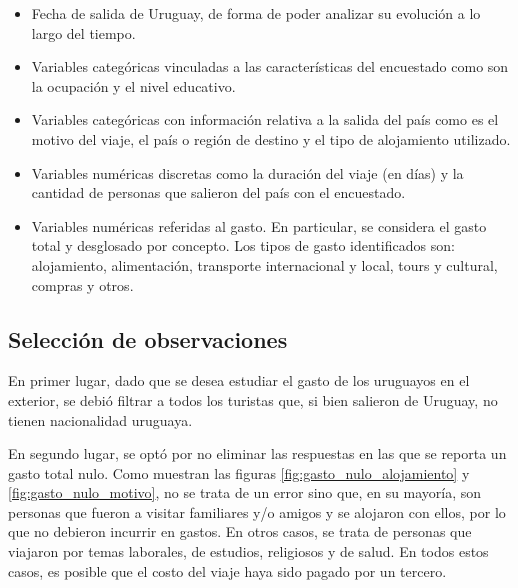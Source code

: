 \documentclass[
]{article}
\providecommand{\tightlist}{%
  \setlength{\itemsep}{0pt}\setlength{\parskip}{0pt}}
\begin{document}
\begin{itemize}
\tightlist
\item
  Fecha de salida de Uruguay, de forma de poder analizar su evolución a
  lo largo del tiempo.
\item
  Variables categóricas vinculadas a las características del encuestado
  como son la ocupación y el nivel educativo.
\item
  Variables categóricas con información relativa a la salida del país
  como es el motivo del viaje, el país o región de destino y el tipo de
  alojamiento utilizado.
\item
  Variables numéricas discretas como la duración del viaje (en días) y
  la cantidad de personas que salieron del país con el encuestado.
\item
  Variables numéricas referidas al gasto. En particular, se considera el
  gasto total y desglosado por concepto. Los tipos de gasto
  identificados son: alojamiento, alimentación, transporte internacional
  y local, tours y cultural, compras y otros.
\end{itemize}

\hypertarget{selecciuxf3n-de-observaciones}{%
\subsection{\texorpdfstring{Selección de observaciones
\label{seleccion_observaciones}}{Selección de observaciones }}\label{selecciuxf3n-de-observaciones}}

En primer lugar, dado que se desea estudiar el gasto de los uruguayos en
el exterior, se debió filtrar a todos los turistas que, si bien salieron
de Uruguay, no tienen nacionalidad uruguaya.

En segundo lugar, se optó por no eliminar las respuestas en las que se
reporta un gasto total nulo. Como muestran las figuras
\ref{fig:gasto_nulo_alojamiento} y \ref{fig:gasto_nulo_motivo}, no se
trata de un error sino que, en su mayoría, son personas que fueron a
visitar familiares y/o amigos y se alojaron con ellos, por lo que no
debieron incurrir en gastos. En otros casos, se trata de personas que
viajaron por temas laborales, de estudios, religiosos y de salud. En
todos estos casos, es posible que el costo del viaje haya sido pagado
por un tercero.
\end{document}
